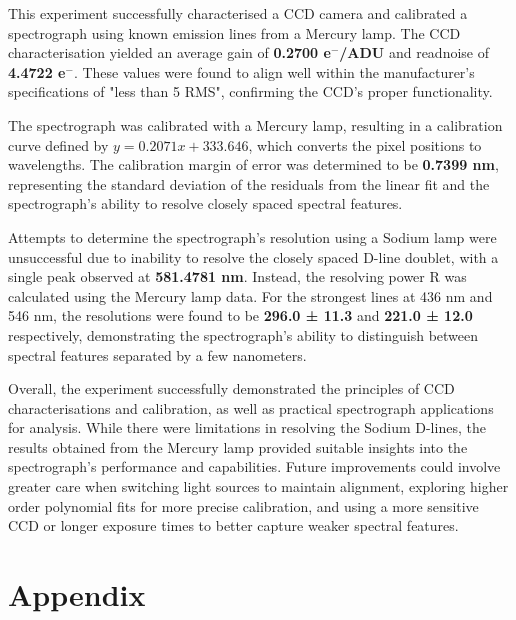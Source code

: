\documentclass[11pt, a4paper, twocolumn]{article}
\begin{document}
This experiment successfully characterised a CCD camera and calibrated a spectrograph using known emission lines from a Mercury lamp.
The CCD characterisation yielded an average gain of \textbf{0.2700 e$^-$/ADU} and readnoise of \textbf{4.4722 e$^-$}. These values 
were found to align well within the manufacturer's specifications of "less than 5 RMS", confirming the CCD's proper functionality.

The spectrograph was calibrated with a Mercury lamp, resulting in a calibration curve defined by $y = 0.2071 x + 333.646$, which converts 
the pixel positions to wavelengths. The calibration margin of error was determined to be \textbf{0.7399 nm}, representing the
standard deviation of the residuals from the linear fit and the spectrograph's ability to resolve closely spaced spectral features.

Attempts to determine the spectrograph's resolution using a Sodium lamp were unsuccessful due to inability to resolve the closely
spaced D-line doublet, with a single peak observed at \textbf{581.4781 nm}. Instead, the resolving power R was calculated using the
Mercury lamp data. For the strongest lines at 436 nm and 546 nm, the resolutions were found to be \textbf{296.0 ± 11.3} and
\textbf{221.0 ± 12.0} respectively, demonstrating the spectrograph's ability to distinguish between spectral features separated
by a few nanometers.

Overall, the experiment successfully demonstrated the principles of CCD characterisations and calibration, as well as practical
spectrograph applications for analysis. While there were limitations in resolving the Sodium D-lines, the results obtained from the
Mercury lamp provided suitable insights into the spectrograph's performance and capabilities. Future improvements could involve
greater care when switching light sources to maintain alignment, exploring higher order polynomial fits for more precise calibration,
and using a more sensitive CCD or longer exposure times to better capture weaker spectral features.


\onecolumn


 \label{sec:ref}

\newpage

\section*{Appendix} \label{sec:A}
\end{document}

